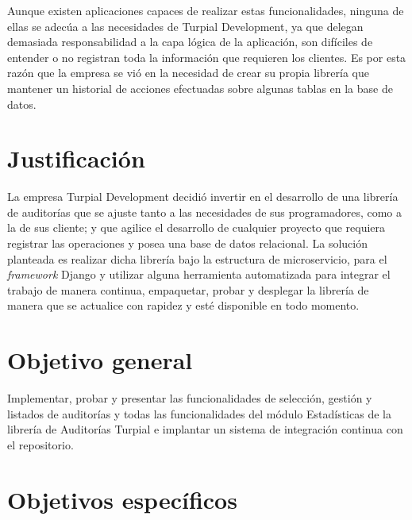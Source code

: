 Aunque existen aplicaciones capaces de realizar estas funcionalidades, ninguna de ellas se adecúa a las necesidades de Turpial Development, ya que delegan demasiada responsabilidad a la capa lógica de la aplicación, son difíciles de entender o no registran toda la información que requieren los clientes. Es por esta razón que la empresa se vió en la necesidad de crear su propia librería que mantener un historial de acciones efectuadas sobre algunas tablas en la base de datos.

\section{Justificación}

La empresa Turpial Development decidió invertir en el desarrollo de una librería de auditorías que se ajuste tanto a las necesidades de sus programadores, como a la de sus cliente; y que agilice el desarrollo de cualquier proyecto que requiera registrar las operaciones y posea una base de datos relacional. La solución planteada es realizar dicha librería bajo la estructura de microservicio, para el \textit{framework} Django y utilizar alguna herramienta automatizada para integrar el trabajo de manera continua, empaquetar, probar y desplegar la librería de manera que se actualice con rapidez y esté disponible en todo momento.

\section{Objetivo general}

Implementar, probar y presentar las funcionalidades de selección, gestión y listados de auditorías y todas las funcionalidades del módulo Estadísticas de la librería de Auditorías Turpial e implantar un sistema de integración continua con el repositorio.  

\section{Objetivos específicos}


